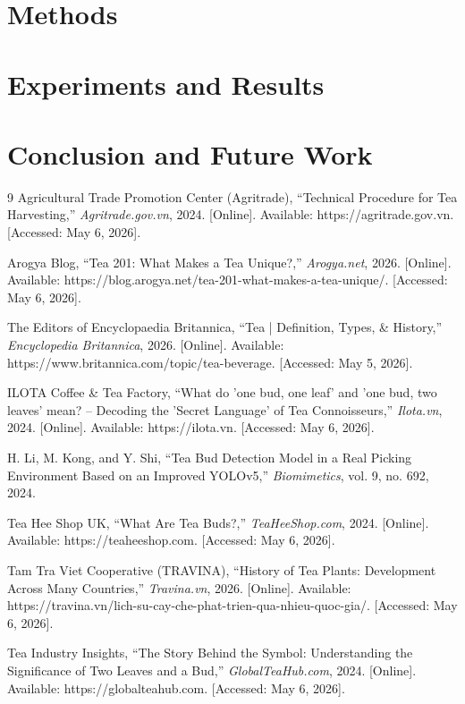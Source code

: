 \documentclass[a4paper,12pt]{report}
\begin{document}
\chapter{Methods}
\chapter{Experiments and Results}
\chapter{Conclusion and Future Work}
\begin{thebibliography}{9}
Agricultural Trade Promotion Center (Agritrade), 
``Technical Procedure for Tea Harvesting,'' 
\textit{Agritrade.gov.vn}, 
2024. [Online]. Available: https://agritrade.gov.vn. [Accessed: May 6, 2026].

Arogya Blog, 
``Tea 201: What Makes a Tea Unique?,'' 
\textit{Arogya.net}, 
2026. [Online]. Available: https://blog.arogya.net/tea-201-what-makes-a-tea-unique/. [Accessed: May 6, 2026].

The Editors of Encyclopaedia Britannica,
``Tea | Definition, Types, \& History,'' 
\textit{Encyclopedia Britannica}, 
2026. [Online]. Available: https://www.britannica.com/topic/tea-beverage. [Accessed: May 5, 2026].

ILOTA Coffee \& Tea Factory, 
``What do 'one bud, one leaf' and 'one bud, two leaves' mean? – Decoding the 'Secret Language' of Tea Connoisseurs,'' 
\textit{Ilota.vn}, 
2024. [Online]. Available: https://ilota.vn. [Accessed: May 6, 2026].

H. Li, M. Kong, and Y. Shi, 
``Tea Bud Detection Model in a Real Picking Environment Based on an Improved YOLOv5,'' 
\textit{Biomimetics}, vol. 9, no. 692, 2024.

Tea Hee Shop UK, 
``What Are Tea Buds?,'' 
\textit{TeaHeeShop.com}, 
2024. [Online]. Available: https://teaheeshop.com. [Accessed: May 6, 2026].

Tam Tra Viet Cooperative (TRAVINA),
``History of Tea Plants: Development Across Many Countries,'' 
\textit{Travina.vn}, 
2026. [Online]. Available: https://travina.vn/lich-su-cay-che-phat-trien-qua-nhieu-quoc-gia/. [Accessed: May 6, 2026].

Tea Industry Insights, 
``The Story Behind the Symbol: Understanding the Significance of Two Leaves and a Bud,'' 
\textit{GlobalTeaHub.com}, 
2024. [Online]. Available: https://globalteahub.com. [Accessed: May 6, 2026].


\end{thebibliography}
\end{document}
